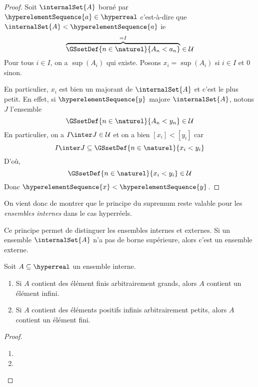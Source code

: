 \begin{proof}
	Soit $\internalSet{A}$ borné par $\hyperelementSequence{a} \in \hyperreal$
	c'est-à-dire que $\internalSet{A} < \hyperelementSequence{a}$ ie
	\begin{equation}
		\overbrace{\GSsetDef{n \in \naturel}{A_{n} < a_{n}}}^{= I} \in \mathcal{U}
	\end{equation}
	Pour tous $i \in I$, on a $\sup(A_{i})$ qui existe.
	Posons $x_{i} = \sup(A_{i})$ si $i \in I$ et $0$ sinon.

	En particulier, $x_{i}$ est bien un majorant de $\internalSet{A}$ et c'est
	le plus petit. En effet, si $\hyperelementSequence{y}$ majore $\internalSet{A}$, notons $J$
	l'ensemble
	\begin{equation}
		\GSsetDef{n \in \naturel}{A_{n} < y_{n}} \in \mathcal{U}
	\end{equation}
	En particulier, on a $I \inter J \in \mathcal{U}$ et on a bien $[x_{i}] <
	[y_{i}]$ car
	\begin{equation}
		I \inter J \subseteq \GSsetDef{n \in \naturel}{x_{i} < y_{i}}
	\end{equation}
	D'où,
	\begin{equation}
		\GSsetDef{n \in \naturel}{x_{i} < y_{i}} \in \mathcal{U}
	\end{equation}
	Donc $\hyperelementSequence{x} < \hyperelementSequence{y}$.
\end{proof}

On vient donc de montrer que le principe du supremum reste valable pour les
\textit{ensembles internes} dans le cas hyperréels.

Ce principe permet de distinguer les ensembles internes et externes. Si un
ensemble $\internalSet{A}$ n'a pas de borne supérieure, alors c'est un
ensemble externe.

\begin{proposition}
	Soit $A \subseteq \hyperreal$ un ensemble interne.

	\begin{enumerate}
		\item Si $A$ contient des élément finis arbitrairement grands, alors $A$
			contient un élément infini.
		\item Si $A$ contient des éléments positifs infinis arbitrairement
			petits, alors $A$ contient un élément fini.
	\end{enumerate}
\end{proposition}

\ifdefined\outputproof
\begin{proof}
	\begin{enumerate}
		\item
		\item
	\end{enumerate}
\end{proof}
\fi

